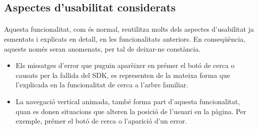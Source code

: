 \subsection{Aspectes d'usabilitat considerats}

    \paragraph{}
    Aquesta funcionalitat, com és normal, reutilitza molts dels aspectes d'usabilitat ja esmentats i explicats en detall, en les funcionalitats anteriors. En conseqüència, aquests només seran anomenats, per tal de deixar-ne constància.

    \begin{itemize}
        \item Els missatges d'error que puguin aparèixer en prémer el botó de cerca o causats per la fallida del SDK, es representen de la mateixa forma que l’explicada en la funcionalitat de cerca a l’arbre familiar.
        \item La navegació vertical animada, també forma part d'aquesta funcionalitat, quan es donen situacions que alteren la posició de l’usuari en la pàgina. Per exemple, prémer el botó de cerca o l'aparició d'un error.
    \end{itemize}

    
    
